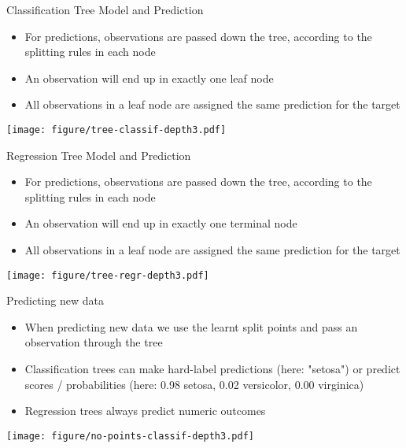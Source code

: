 \documentclass[11pt,compress,t,notes=noshow, xcolor=table]{beamer}
\begin{document}
\begin{vbframe}{Classification Tree Model and Prediction}
  \begin{itemize}
    \item For predictions, observations are passed down the tree, according to the splitting rules in each node
    \item An observation will end up in exactly one leaf node
    \item All observations in a leaf node are assigned the same prediction for the target
  \end{itemize}

\color{fgcolor}
{\centering \texttt{[image: figure/tree-classif-depth3.pdf]}

}

\end{vbframe}

\begin{vbframe}{Regression Tree Model and Prediction}
  \begin{itemize}
    \item For predictions, observations are passed down the tree, according to the splitting rules
      in each node
    \item An observation will end up in exactly one terminal node
    \item All observations in a leaf node are assigned the same prediction for the target
  \end{itemize}

\color{fgcolor}
{\centering \texttt{[image: figure/tree-regr-depth3.pdf]}

}

\end{vbframe}



\begin{vbframe}{Predicting new data}
\begin{itemize}
\item When predicting new data we use the learnt split points and pass an observation through the tree
\item Classification trees can make hard-label predictions (here: "setosa") or predict scores / probabilities (here: 0.98 setosa, 0.02 versicolor, 0.00 virginica)
\item Regression trees always predict numeric outcomes
\end{itemize}

\color{fgcolor}
{\centering \texttt{[image: figure/no-points-classif-depth3.pdf]}

}
\end{vbframe}
\end{document}
